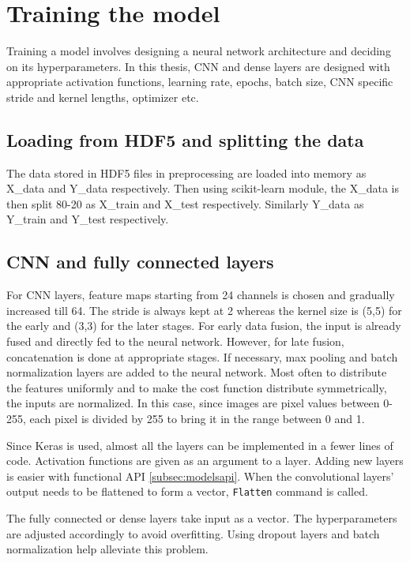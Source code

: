 \section{Training the model}
Training a model involves designing a neural network architecture and deciding on its
hyperparameters. In this thesis, CNN and dense layers are designed with appropriate
activation functions, learning rate, epochs, batch size, CNN specific stride and kernel
lengths, optimizer etc.

\subsection{Loading from HDF5 and splitting the data}
The data stored in HDF5 files in preprocessing are loaded into memory as X\_data and
Y\_data respectively. Then using scikit-learn module, the X\_data is then split 80-20
as X\_train and X\_test respectively. Similarly Y\_data as Y\_train and Y\_test respectively.

\subsection{CNN and fully connected layers}
For CNN layers, feature maps starting from 24 channels is chosen and gradually increased till 64.
The stride is always kept at 2 whereas the kernel size is (5,5) for the early and
(3,3) for the later stages. For early data fusion, the input is already fused and directly
fed to the neural network. However, for late fusion, concatenation is done at appropriate
stages. If necessary, max pooling and batch normalization layers are added to the neural
network. Most often to distribute the features uniformly and to make the cost function
distribute symmetrically, the inputs are normalized. In this case, since images are pixel
values between 0-255, each pixel is divided by 255 to bring it in the range between 0 and
1.

Since Keras is used, almost all the layers can be implemented in a fewer lines of code.
Activation functions are given as an argument to a layer. Adding new layers is easier with
functional API \ref{subsec:modelsapi}. When the convolutional layers' output needs to be
flattened to form a vector, \texttt{Flatten} command is called.

The fully connected or dense layers take input as a vector. The hyperparameters are
adjusted accordingly to avoid overfitting. Using dropout layers and batch normalization
help alleviate this problem.

